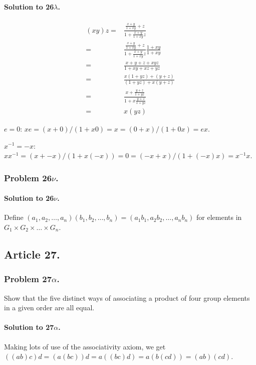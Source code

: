 \paragraph*{Solution to 26$\lambda$.}
\begin{eqnarray*}
(xy)z = & \frac{\frac{x+y}{1+xy} + z}{1+\frac{x+y}{1+xy}z} \\
      = & \frac{\frac{x+y}{1+xy} + z}{1+\frac{x+y}{1+xy}z} \frac{1+xy}{1+xy} \\
      = & \frac{x + y + z + xyz}{1 + xy + xz + yz} \\
      = & \frac{x(1+yz) + (y+z)}{(1+yz) + x(y+z)} \\
      = & \frac{x + \frac{y+z}{1+yz}}{1 + x \frac{y+z}{1+yz}} \\
      = & x(yz)
\end{eqnarray*}

$e = 0$: $xe = (x + 0)/(1 + x0) = x = (0 + x)/(1 + 0x) = ex$.

$x^{-1} = -x$: $xx^{-1} = (x + -x)/(1 + x(-x)) = 0 = (-x + x)/(1+(-x)x) = x^{-1}x$.

\subsubsection{Problem 26$\nu$.}

\paragraph*{Solution to 26$\nu$.}
Define $(a_1, a_2, \dots, a_n)(b_1,b_2,\dots,b_n) = (a_1 b_1, a_2 b_2, \dots, a_n b_n)$
for elements in $G_1 \times G_2 \times \dots \times G_n$.

\subsection{Article 27.}
\subsubsection{Problem 27$\alpha$.}
Show that the five distinct ways of associating a product of four group elements
in a given order are all equal.

\paragraph*{Solution to 27$\alpha$.}
Making lots of use of the associativity axiom, we get
$ ((ab)c)d = (a(bc))d = a((bc)d) = a(b(cd)) = (ab)(cd) $.

